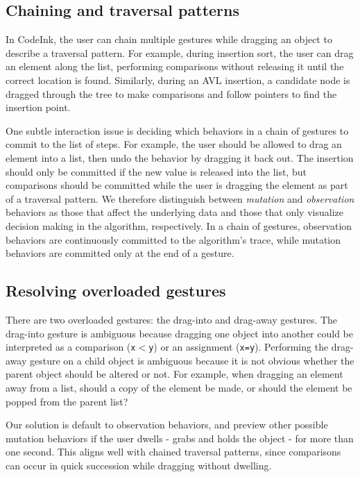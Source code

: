 \subsection{Chaining and traversal patterns}
In CodeInk, the user can chain multiple gestures while dragging an object to
describe a traversal pattern. For example, during insertion sort, the user can
drag an element along the list, performing comparisons without releasing it
until the correct location is found. Similarly, during an AVL insertion, a
candidate node is dragged through the tree to make comparisons and follow
pointers to find the insertion point.

One subtle interaction issue is deciding which behaviors in a chain of gestures
to commit to the list of steps. For example, the user should be allowed to drag
an element into a list, then undo the behavior by dragging it back out. The
insertion should only be committed if the new value is released into the list,
but comparisons should be committed while the user is dragging the element as
part of a traversal pattern. We therefore distinguish between \emph{mutation}
and \emph{observation} behaviors as those that affect the underlying data and
those that only visualize decision making in the algorithm, respectively. In a
chain of gestures, observation behaviors are continuously committed to the
algorithm's trace, while mutation behaviors are committed only at the end of a
gesture.

\subsection{Resolving overloaded gestures}
\label{sec:overloaded-gestures}

There are two overloaded gestures: the drag-into and drag-away gestures. The
drag-into gesture is ambiguous because dragging one object into another could be
interpreted as a comparison (\texttt{x$<$y}) or an assignment (\texttt{x=y}).
Performing the drag-away gesture on a child object is ambiguous because it is
not obvious whether the parent object should be altered or not.
For example, when dragging an element away from a list, should a copy of the
element be made, or should the element be popped from the parent list?

Our solution is default to observation behaviors, and preview other possible
mutation behaviors if the user dwells - grabs and holds the object - for more
than one second.
This aligns well with chained traversal patterns, since comparisons can occur in
quick succession while dragging without dwelling.
